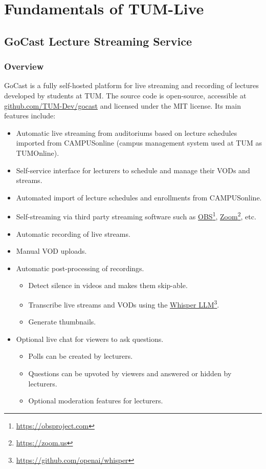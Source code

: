 
\chapter{Fundamentals of TUM-Live}\label{chapter:fundamentals}

\section{GoCast Lecture Streaming Service}

\subsection{Overview}
GoCast is a fully self-hosted platform for live streaming and recording of lectures developed by students at \ac{TUM}. The source code is open-source, accessible at \href{https://github.com/TUM-Dev/gocast}{github.com/TUM-Dev/gocast} and licensed under the MIT license. Its main features include:

\begin{itemize}
    \item Automatic live streaming from auditoriums based on lecture schedules imported from CAMPUSonline (campus management system used at \ac{TUM} as TUMOnline).
    \item Self-service interface for lecturers to schedule and manage their \ac{VOD}s and streams.
    \item Automated import of lecture schedules and enrollments from CAMPUSonline.
    \item Self-streaming via third party streaming software such as \href{https://obsproject.com}{OBS}\footnote{\url{https://obsproject.com}}, \href{https://zoom.us}{Zoom}\footnote{\url{https://zoom.us}}, etc.
    \item Automatic recording of live streams.
    \item Manual \ac{VOD} uploads.
    \item Automatic post-processing of recordings.
    \begin{itemize}
        \item Detect silence in videos and makes them skip-able.
        \item Transcribe live streams and \ac{VOD}s using the \href{https://github.com/openai/whisper}{Whisper LLM}\footnote{\url{https://github.com/openai/whisper}}.
        \item Generate thumbnails.
    \end{itemize}
    \item Optional live chat for viewers to ask questions.
    \begin{itemize}
        \item Polls can be created by lecturers.
        \item Questions can be upvoted by viewers and answered or hidden by lecturers.
        \item Optional moderation features for lecturers.
    \end{itemize}
\end{itemize}

